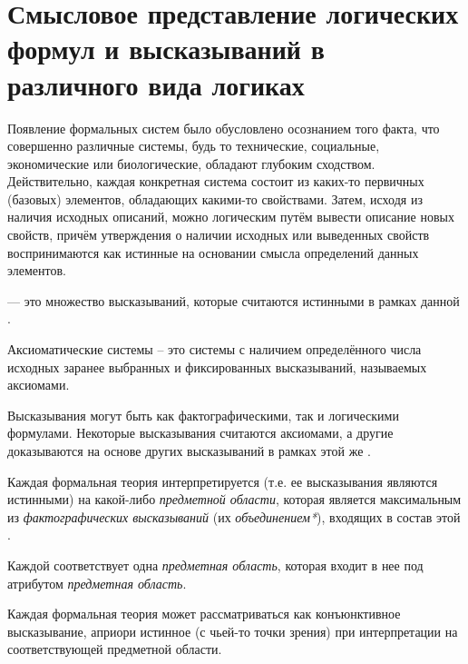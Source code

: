 \chapter{Смысловое представление логических формул и высказываний в различного вида логиках}
\label{chapter_logic}


Появление формальных систем было обусловлено осознанием того факта, что совершенно различные системы, будь то технические, социальные, экономические или биологические, обладают глубоким сходством. Действительно, каждая конкретная система состоит из каких-то первичных (базовых) элементов, обладающих какими-то свойствами. Затем, исходя из наличия исходных описаний, можно логическим путём вывести описание новых свойств, причём утверждения о наличии исходных или выведенных свойств воспринимаются как истинные на основании смысла определений данных элементов.

 — это множество высказываний, которые считаются истинными в рамках данной .

Аксиоматические системы -- это системы с наличием определённого числа исходных заранее выбранных и фиксированных высказываний, называемых аксиомами.

Высказывания могут быть как фактографическими, так и логическими формулами. Некоторые высказывания считаются аксиомами, а другие доказываются на основе других высказываний в рамках этой же .

Каждая формальная теория интерпретируется (т.е. ее высказывания являются истинными) на какой-либо \textit{предметной области}, которая является максимальным из \textit{фактографических высказываний} (их \textit{объединением*}),  входящих в состав этой .

Каждой  соответствует одна \textit{предметная область}, которая входит в нее под атрибутом \textit{предметная область\scnrolesign}.

Каждая формальная теория может рассматриваться как конъюнктивное высказывание, априори истинное (с чьей-то точки зрения) при интерпретации на соответствующей предметной области.

